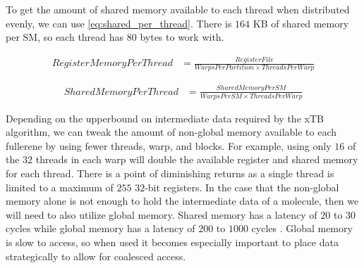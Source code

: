 To get the amount of shared memory available to each thread when distributed evenly, we can use \autoref{eq:shared_per_thread}. There is $164$ KB of shared memory per SM, so each thread has $80$ bytes to work with.

\begin{equation}
\begin{split}
        RegisterMemoryPerThread &= \frac{RegisterFile}{WarpsPerPartition \times ThreadsPerWarp} \label{eq:reg_per_thread}
\end{split}
\end{equation}

\begin{equation}
\begin{split}
        SharedMemoryPerThread &= \frac{SharedMemoryPerSM}{WarpsPerSM \times ThreadsPerWarp} \label{eq:shared_per_thread}
\end{split}
\end{equation}


Depending on the upperbound on intermediate data required by the xTB algorithm, we can tweak the amount of non-global memory available to each fullerene by using fewer threads, warp, and blocks. For example, using only $16$ of the $32$ threads in each warp will double the available register and shared memory for each thread. There is a point of diminishing returns as a single thread is limited to a maximum of $255$ $32$-bit registers. In the case that the non-global memory alone is not enough to hold the intermediate data of a molecule, then we will need to also utilize global memory. Shared memory has a latency of $20$ to $30$ cycles while global memory has a latency of $200$ to $1000$ cycles \cite{nasa-nvidia-basics}. Global memory is slow to access, so when used it becomes especially important to place data strategically to allow for coalesced access.

